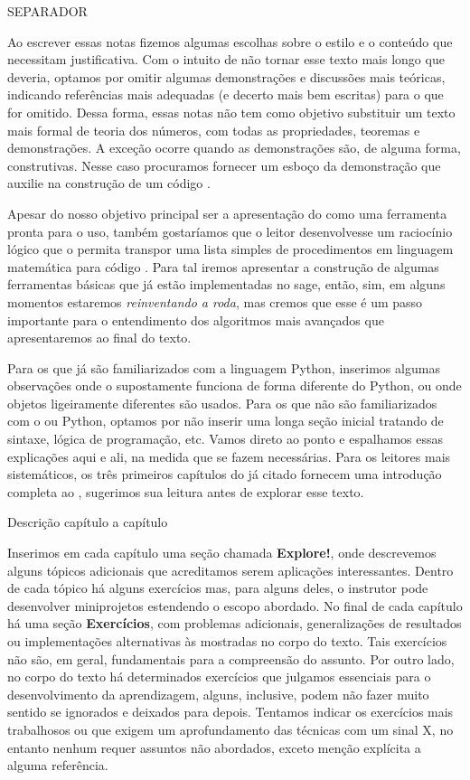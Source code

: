 SEPARADOR

Ao escrever essas notas fizemos algumas escolhas sobre o estilo e o conteúdo
que necessitam justificativa.
Com o intuito de não tornar esse texto mais longo que deveria, optamos
por omitir algumas demonstrações e discussões
mais teóricas, indicando referências mais adequadas
(e decerto mais bem escritas) para o que for omitido. Dessa forma, essas notas 
não tem como objetivo substituir um texto mais formal de teoria dos números,
com todas as propriedades, teoremas e demonstrações.
A exceção  ocorre quando as demonstrações são, de alguma forma, construtivas.
Nesse caso procuramos fornecer um esboço da demonstração que
auxilie na construção de um código \sage.

Apesar do nosso objetivo principal ser a apresentação do \sage
como uma ferramenta pronta para o uso, também gostaríamos que
o leitor desenvolvesse um raciocínio lógico que o permita
transpor uma lista simples de procedimentos em linguagem matemática
para código \sage. Para tal iremos apresentar a construção de algumas
ferramentas básicas que já estão implementadas no sage, então, sim,
em alguns momentos estaremos \emph{reinventando a roda}, mas cremos
que esse é um passo importante para o entendimento dos 
algoritmos mais avançados que apresentaremos ao final do texto.

Para os que já são familiarizados com a linguagem Python, inserimos algumas
observações onde o \sage supostamente funciona de forma diferente do Python,
ou onde objetos ligeiramente diferentes são usados.
Para os que não são familiarizados com o \sage ou Python, optamos por
não inserir uma longa seção  inicial tratando de sintaxe,
lógica de programação, etc. Vamos direto ao ponto e espalhamos essas explicações
aqui e ali, na medida que se fazem necessárias. Para os leitores
mais sistemáticos, os três primeiros
capítulos do já citado \cite{sagesbm} fornecem uma introdução
completa ao \sage, sugerimos sua leitura antes de explorar
esse texto.

{\color{blue} Descrição capítulo a capítulo}

Inserimos em cada capítulo uma seção 
chamada \textbf{Explore!}, onde descrevemos
alguns tópicos adicionais
que acreditamos serem aplicações interessantes. Dentro
de cada tópico há alguns
exercícios mas, para alguns deles,  o instrutor pode desenvolver miniprojetos
estendendo o escopo abordado. No final de cada capítulo
há uma seção \textbf{Exercícios}, com problemas adicionais,
generalizações de resultados ou implementações alternativas
às mostradas no corpo do texto. Tais exercícios
não são, em geral, fundamentais para a
compreensão do assunto. Por outro lado, no corpo do texto
há determinados exercícios que julgamos essenciais
para o desenvolvimento da aprendizagem, alguns,
inclusive, podem não fazer muito sentido se ignorados e
deixados para depois.
Tentamos indicar
os exercícios mais trabalhosos ou que exigem um 
aprofundamento das técnicas com um sinal X, no entanto
nenhum requer assuntos não abordados, exceto 
menção explícita a alguma referência.


